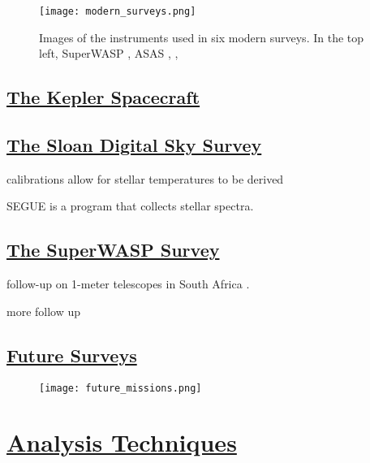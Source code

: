 \documentclass[12pt]{article} %
\numberwithin{equation}{section} %
\begin{document}
\begin{figure}[H]
\centering
\texttt{[image: modern\_surveys.png]}
\caption{Images of the instruments used in six modern surveys. In the top left, SuperWASP \citep[SuperWASP,][]{norton2011short}, ASAS \citep[ASAS,][]{pojmanski2000all}, \citep[ROTSE,][]{akerlof2000rotse},  }
\label{fig: modern_surveys}
\end{figure}


\subsection[The Kepler Spacecraft]{\hyperlink{toc}{The Kepler Spacecraft}}

\subsection[The Sloan Digital Sky Survey]{\hyperlink{toc}{The Sloan Digital Sky Survey}}

\cite{york2000sloan}

\citep{ivezic2007sloan} 

calibrations allow for stellar temperatures to be derived \cite{fukugita2011characterization}

SEGUE is a program that collects stellar spectra.

\subsection[The SuperWASP Survey]{\hyperlink{toc}{The SuperWASP Survey}}

follow-up on 1-meter telescopes in South Africa \citep{koen2016multi}.

more follow up \citep{darwish2016orbital}


\subsection[Future Surveys]{\hyperlink{toc}{Future Surveys}}

\begin{figure}[H]
\centering
\texttt{[image: future\_missions.png]}
\caption{}
\label{fig: future_missions}
\end{figure}



\section[Analysis Techniques]{\hyperlink{toc}{Analysis Techniques}} \label{sec: analysis_techniques}
\end{document}
